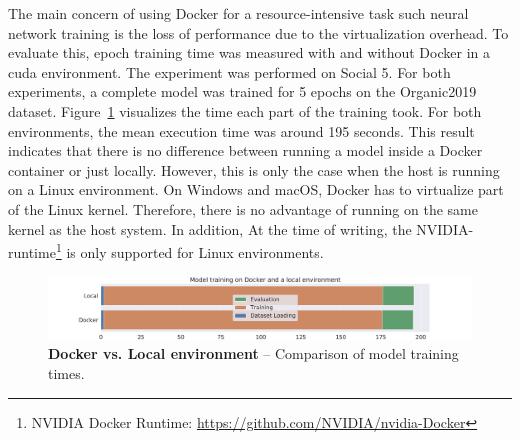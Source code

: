 The main concern of using Docker for a resource-intensive task such neural network training is the loss of performance due to the virtualization overhead. To evaluate this, epoch training time was measured with and without Docker in a \gls{cuda} environment. The experiment was performed on Social 5. For both experiments, a complete model was trained for 5 epochs on the Organic2019 dataset. Figure~\ref{fig:05_dockerExecution} visualizes the time each part of the training took. For both environments, the mean execution time was around 195 seconds. This result indicates that there is no difference between running a model inside a Docker container or just locally. However, this is only the case when the host is running on a Linux environment. On Windows and macOS, Docker has to virtualize part of the Linux kernel. Therefore, there is no advantage of running on the same kernel as the host system. In addition, At the time of writing, the NVIDIA-runtime\footnote{NVIDIA Docker Runtime: \url{https://github.com/NVIDIA/nvidia-Docker}} is only supported for Linux environments.

\begin{figure}[htb]
    \centering
    \includegraphics[width=\textwidth]{figures/05_setup/05_dockerExecution}
    \caption{\textbf{Docker vs. Local environment} -- Comparison of model training times.}
    \label{fig:05_dockerExecution}
\end{figure}